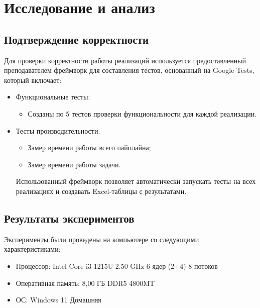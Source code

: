 \documentclass[]{article}
\theoremstyle{remark}
\theoremstyle{definition}
\begin{document}
\newpage

\section{Исследование и анализ}

\subsection{Подтверждение корректности}

\par Для проверки корректности работы реализаций используется предоставленный преподавателем фреймворк для составления тестов, основанный на Google Tests, который включает:

\begin{itemize}
    \item Функциональные тесты:
    \begin{itemize}
        \item Созданы по 5 тестов проверки функциональности для каждой реализации.
    \end{itemize}
    \item Тесты производительности:
    \begin{itemize}
        \item Замер времени работы всего пайплайна;
        \item Замер времени работы задачи.
    \end{itemize}

    \par Использованный фреймворк позволяет автоматически запускать тесты на всех реализациях и создавать Excel-таблицы с результатами. 
\end{itemize}

\subsection{Результаты экспериментов}

\par Эксперименты были проведены на компьютере со следующими характеристиками:

\begin{itemize}
    \item Процессор: Intel Core i3-1215U 2.50 GHz 6 ядер (2+4) 8 потоков
    \item Оперативная память: 8,00 ГБ DDR5 4800MT
    \item ОС: Windows 11 Домашняя
\end{itemize}
\end{document}
